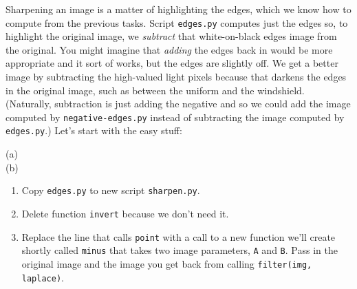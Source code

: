 Sharpening an image is a matter of highlighting the edges, which we know how to compute from the previous tasks. Script {\tt edges.py} computes just the edges so, to highlight the original image, we {\em subtract} that white-on-black edges image from the original.  You might imagine that {\em adding} the edges back in would be more appropriate and it sort of works, but the edges are slightly off. We get a better image by subtracting the high-valued light pixels because that darkens the edges in the original image, such as between the uniform and the windshield. (Naturally, subtraction is just adding the negative and so we could add the image computed by {\tt negative-edges.py} instead of subtracting the image computed by {\tt edges.py}.) Let's start with the easy stuff:

\begin{marginfigure}
\begin{center}
(a) \\
(b) 
\end{center}
\caption{Bonkers the cat portrait. (a) original and (b) sharpened as computed by {\tt sharpen.py}.}
\label{jeepedges}
\end{marginfigure}

\begin{enumerate}
\item Copy {\tt edges.py} to new script {\tt sharpen.py}.
\item Delete function {\tt invert} because we don't need it.
\item  Replace the line that calls {\tt point} with a call to a new function we'll create shortly called {\tt minus} that takes two image parameters, {\tt A} and {\tt B}. Pass in the original image and the image you get back from calling {\tt filter(img, laplace)}.
\end{enumerate}

